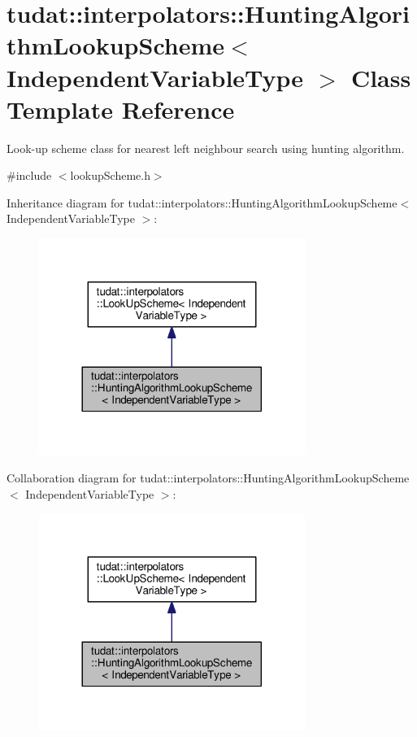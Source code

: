 \hypertarget{classtudat_1_1interpolators_1_1HuntingAlgorithmLookupScheme}{}\section{tudat\+:\+:interpolators\+:\+:Hunting\+Algorithm\+Lookup\+Scheme$<$ Independent\+Variable\+Type $>$ Class Template Reference}
\label{classtudat_1_1interpolators_1_1HuntingAlgorithmLookupScheme}


Look-\/up scheme class for nearest left neighbour search using hunting algorithm.  




{\ttfamily \#include $<$lookup\+Scheme.\+h$>$}



Inheritance diagram for tudat\+:\+:interpolators\+:\+:Hunting\+Algorithm\+Lookup\+Scheme$<$ Independent\+Variable\+Type $>$\+:
\nopagebreak
\begin{figure}[H]
\begin{center}
\leavevmode
\includegraphics[width=245pt]{classtudat_1_1interpolators_1_1HuntingAlgorithmLookupScheme__inherit__graph}
\end{center}
\end{figure}


Collaboration diagram for tudat\+:\+:interpolators\+:\+:Hunting\+Algorithm\+Lookup\+Scheme$<$ Independent\+Variable\+Type $>$\+:
\nopagebreak
\begin{figure}[H]
\begin{center}
\leavevmode
\includegraphics[width=245pt]{classtudat_1_1interpolators_1_1HuntingAlgorithmLookupScheme__coll__graph}
\end{center}
\end{figure}
